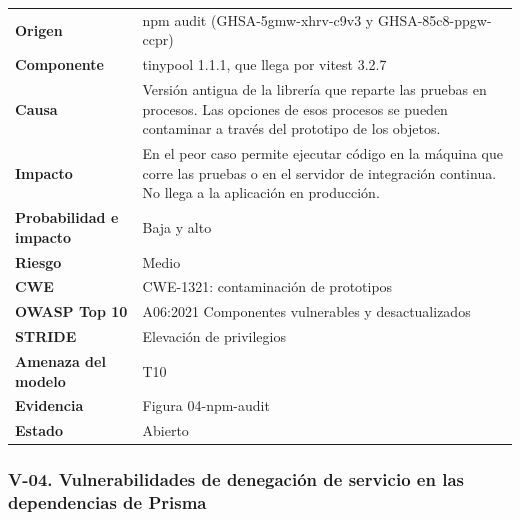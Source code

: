 \documentclass[12pt, letterpaper]{article}
\begin{document}
\begingroup\small\setlength{\tabcolsep}{4pt}\renewcommand{\arraystretch}{1.25}
\begin{longtable}{L{0.24}L{0.70}}
\toprule
\endfirsthead
\toprule
\endhead
\bottomrule
\endfoot
\textbf{Origen} & npm audit (GHSA-5gmw-xhrv-c9v3 y GHSA-85c8-ppgw-ccpr) \\
\textbf{Componente} & tinypool 1.1.1, que llega por vitest 3.2.7 \\
\textbf{Causa} & Versión antigua de la librería que reparte las pruebas en procesos. Las opciones de esos procesos se pueden contaminar a través del prototipo de los objetos. \\
\textbf{Impacto} & En el peor caso permite ejecutar código en la máquina que corre las pruebas o en el servidor de integración continua. No llega a la aplicación en producción. \\
\textbf{Probabilidad e impacto} & Baja y alto \\
\textbf{Riesgo} & Medio \\
\textbf{CWE} & CWE-1321: contaminación de prototipos \\
\textbf{OWASP Top 10} & A06:2021 Componentes vulnerables y desactualizados \\
\textbf{STRIDE} & Elevación de privilegios \\
\textbf{Amenaza del modelo} & T10 \\
\textbf{Evidencia} & Figura 04-npm-audit \\
\textbf{Estado} & Abierto \\
\end{longtable}
\endgroup

\subsubsection*{V-04. Vulnerabilidades de denegación de servicio en las dependencias de Prisma}
\end{document}
